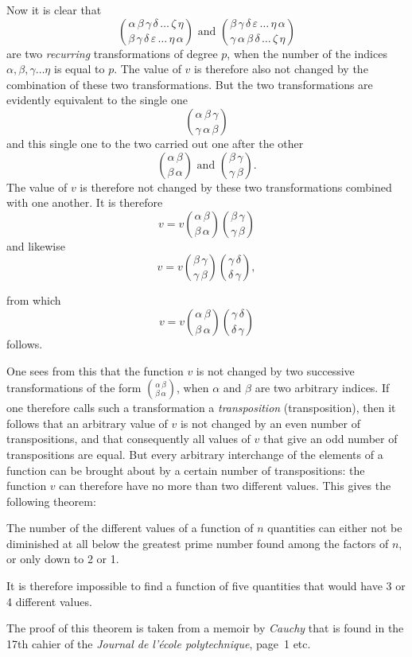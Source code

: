 \documentclass{article}
\begin{document}
Now it is clear that
\[ \binom{\alpha\,\beta\,\gamma\,\delta\,\ldots\,\zeta\,\eta}{\beta\,\gamma\,\delta\,\varepsilon\,\ldots\,\eta\,\alpha} \text{ and } \binom{\beta\,\gamma\,\delta\,\varepsilon\,\ldots\,\eta\,\alpha}{\gamma\,\alpha\,\beta\,\delta\,\ldots\,\zeta\,\eta} \]
are two \emph{recurring} transformations of degree $p$, when the number of the indices $\alpha, \beta, \gamma \ldots \eta$ is equal to $p$. The value of $v$ is therefore also not changed by the combination of these two transformations. But the two transformations are evidently equivalent to the single one
\[ \binom{\alpha\,\beta\,\gamma}{\gamma\,\alpha\,\beta} \]
and this single one to the two carried out one after the other
\[ \binom{\alpha\,\beta}{\beta\,\alpha} \text{ and } \binom{\beta\,\gamma}{\gamma\,\beta}. \]
The value of $v$ is therefore not changed by these two transformations combined with one another. It is therefore
\[ v = v\binom{\alpha\,\beta}{\beta\,\alpha}\binom{\beta\,\gamma}{\gamma\,\beta} \]
and likewise
\[ v = v\binom{\beta\,\gamma}{\gamma\,\beta}\binom{\gamma\,\delta}{\delta\,\gamma}, \]

from which
\[ v = v\binom{\alpha\,\beta}{\beta\,\alpha}\binom{\gamma\,\delta}{\delta\,\gamma} \]
follows.

One sees from this that the function $v$ is not changed by two successive transformations of the form $\binom{\alpha\,\beta}{\beta\,\alpha}$, when $\alpha$ and $\beta$ are two arbitrary indices. If one therefore calls such a transformation a \emph{transposition} (transposition), then it follows that an arbitrary value of $v$ is not changed by an even number of transpositions, and that consequently all values of $v$ that give an odd number of transpositions are equal. But every arbitrary interchange of the elements of a function can be brought about by a certain number of transpositions: the function $v$ can therefore have no more than two different values. This gives the following theorem:

The number of the different values of a function of $n$ quantities can either not be diminished at all below the greatest prime number found among the factors of $n$, or only down to 2 or 1.

It is therefore impossible to find a function of five quantities that would have 3 or 4 different values.

The proof of this theorem is taken from a memoir by \emph{Cauchy} that is found in the 17th cahier of the \emph{Journal de l'école polytechnique}, page\ 1 etc.
\end{document}
